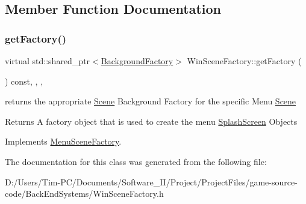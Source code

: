 \subsection{Member Function Documentation}
\mbox{\label{class_win_scene_factory_af2e1c7ae34601b5f4017937d7bd381bb}} 
\subsubsection{\texorpdfstring{get\+Factory()}{getFactory()}}
{\footnotesize\ttfamily virtual std\+::shared\+\_\+ptr$<$\hyperlink{class_background_factory}{Background\+Factory}$>$ Win\+Scene\+Factory\+::get\+Factory (\begin{DoxyParamCaption}{ }\end{DoxyParamCaption}) const\hspace{0.3cm}{\ttfamily [inline]}, {\ttfamily [override]}, {\ttfamily [protected]}, {\ttfamily [virtual]}}



returns the appropriate \hyperlink{class_scene}{Scene} Background Factory for the specific Menu \hyperlink{class_scene}{Scene} 

\begin{DoxyReturn}{Returns}
A factory object that is used to create the menu \hyperlink{class_splash_screen}{Splash\+Screen} Objects 
\end{DoxyReturn}


Implements \hyperlink{class_menu_scene_factory_ad0f60a16fdbb10c6d7ba3311dafa2e76}{Menu\+Scene\+Factory}.



The documentation for this class was generated from the following file\+:\begin{DoxyCompactItemize}
\item 
D\+:/\+Users/\+Tim-\/\+P\+C/\+Documents/\+Software\+\_\+\+I\+I/\+Project/\+Project\+Files/game-\/source-\/code/\+Back\+End\+Systems/Win\+Scene\+Factory.\+h\end{DoxyCompactItemize}
